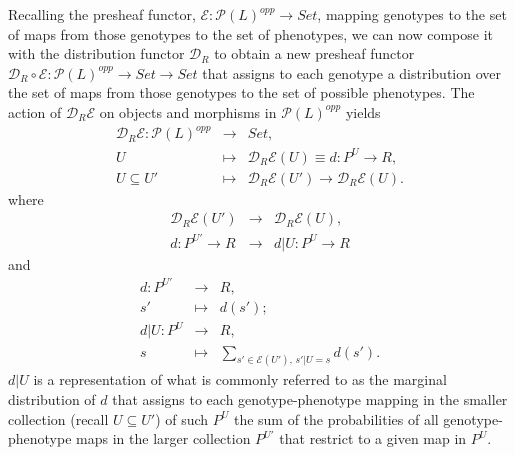 Recalling the presheaf functor, $\mathcal{E} \colon \mathcal{P}(L)^{opp} \rightarrow Set$, mapping genotypes to the set of maps from those genotypes to the set of phenotypes, we can now compose it with the distribution functor $\mathcal{D}_R$ to obtain a new presheaf functor $\mathcal{D}_R \circ \mathcal{E} \colon \mathcal{P}(L)^{opp} \rightarrow Set \rightarrow Set$ that assigns to each genotype a distribution over the set of maps from those genotypes to the set of possible phenotypes. The action of $\mathcal{D}_R \mathcal{E}$ on objects and morphisms in $\mathcal{P}(L)^{opp}$ yields
\begin{eqnarray*}
\mathcal{D}_R \mathcal{E} \colon \mathcal{P}(L)^{opp} &\rightarrow& Set,\\
U &\mapsto& \mathcal{D}_R \mathcal{E}(U) \equiv d \colon P^U \rightarrow R,\\
U \subseteq U' &\mapsto& \mathcal{D}_R \mathcal{E}(U') \rightarrow \mathcal{D}_R \mathcal{E}(U).
\end{eqnarray*}
where
\begin{eqnarray*}
\mathcal{D}_R \mathcal{E}(U') &\rightarrow& \mathcal{D}_R \mathcal{E}(U),\\
d \colon P^{U'} \rightarrow R &\rightarrow& d|U \colon P^{U} \rightarrow R
\end{eqnarray*}
and
\begin{eqnarray*}
d \colon P^{U'} &\rightarrow& R,\\
s' &\mapsto& d(s');\\
d|U \colon P^{U} &\rightarrow& R,\\
s &\mapsto& \sum_{s' \in \mathcal{E}(U'),\, s'|U=s} d(s').
\end{eqnarray*}
$d|U$ is a representation of what is commonly referred to as the marginal distribution of $d$ that assigns to each genotype-phenotype mapping in the smaller collection (recall $U \subseteq U'$) of such $P^{U}$ the sum of the probabilities of all genotype-phenotype maps in the larger collection $P^{U'}$ that restrict to a given map in $P^{U}$.

